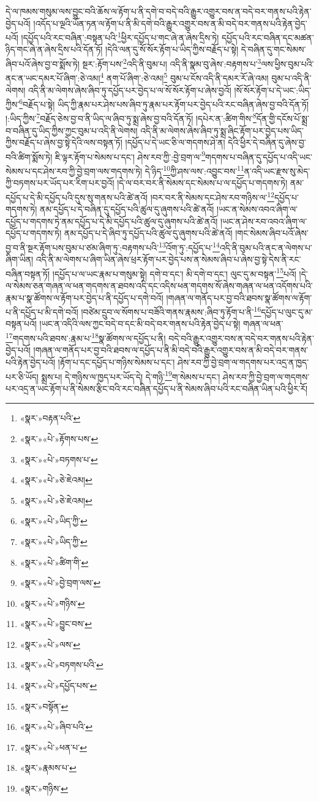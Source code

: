 དེ་ལ་ཁམས་གསུམ་ལས་བྱུང་བའི་ཆོས་ལ་རྟོག་པ་ནི་དགེ་བ་བདེ་བའི་རྒྱུར་འགྱུར་བས་ན་བདེ་བར་གནས་པའི་རྟེན་བྱེད་པའོ། །འདོད་པ་ལྔའི་ཡོན་ཏན་ལ་རྟོག་པ་ནི་མི་དགེ་བའི་རྒྱུར་འགྱུར་བས་ན་མི་བདེ་བར་གནས་པའི་རྟེན་བྱེད་པའོ། །དཔྱོད་པའི་རང་བཞིན་:བསྟན་པའི་\footnote{«སྣར་»བརྟན་པའི་}ཕྱིར་དཔྱོད་པ་གང་ཞེ་ན་ཞེས་དྲིས་ཏེ། དཔྱོད་པའི་རང་བཞིན་དང་མཚན་ཉིད་གང་ཞེ་ན་ཞེས་དྲིས་པའི་དོན་ཏོ། །དེའི་ལན་དུ་སོ་སོར་རྟོག་པ་ཡིད་ཀྱིས་བརྗོད་པ་སྟེ། དེ་བཞིན་དུ་གང་སེམས་ཞིབ་པའོ་ཞེས་བྱ་བ་སྨོས་ཏེ། སྔར་:རྟོག་པས་\footnote{«སྣར་»«པེ་»རྟོགས་པས་}འདི་ནི་བུམ་པ། འདི་ནི་སྣམ་བུ་ཞེས་:བརྟགས་པ་\footnote{«སྣར་»«པེ་»བཏགས་པ་}ལས་ཕྱིས་བུམ་པའི་ནང་ན་ཡང་དམར་པོ་ཞིག་:ཅེ་འམ།\footnote{«སྣར་»«པེ་»ཅེ་ཇེའམ།} ནག་པོ་ཞིག་:ཅེ་འམ།\footnote{«སྣར་»«པེ་»ཅེ་ཇེའམ།} བུམ་པ་ངོས་འདི་ནི་དམར་རོ་ཞེ་འམ། བུམ་པ་འདི་ནི་ལེགས། འདི་ནི་མ་ལེགས་ཞེས་ཞིབ་ཏུ་དཔྱོད་པར་བྱེད་པ་ལ་སོ་སོར་རྟོག་པ་ཞེས་བྱའོ། །སོ་སོར་རྟོག་པ་དེ་ཡང་:ཡིད་ཀྱིས་\footnote{«སྣར་»«པེ་»ཡིད་ཀྱི་}བརྗོད་པ་སྟེ། ཡིད་ཀྱི་རྣམ་པར་ཤེས་པས་ཞིབ་ཏུ་རྣམ་པར་རྟོག་པར་བྱེད་པའི་རང་བཞིན་ཞེས་བྱ་བའི་དོན་ཏོ། །:ཡིད་ཀྱིས་\footnote{«སྣར་»«པེ་»ཡིད་ཀྱི་}བརྗོད་ཅེས་བྱ་བ་ནི་ཡིད་ལ་ཞིབ་ཏུ་སྨྲ་ཞེས་བྱ་བའི་དོན་ཏོ། །དཔེར་ན་:ཚིག་གིས་\footnote{«སྣར་»«པེ་»ཚིག་གི་}དོན་གྱི་དངོས་པོ་སྨྲ་བ་བཞིན་དུ་ཡིད་ཀྱིས་ཀྱང་བུམ་པ་འདི་ནི་ལེགས། འདི་ནི་མ་ལེགས་ཞེས་ཞིབ་ཏུ་སྨྲ་ཞིང་རྟོག་པར་བྱེད་པས་ཡིད་ཀྱིས་བརྗོད་པ་ཞེས་བྱ་སྟེ་དེའི་ལས་བསྟན་ཏོ། །དཔྱོད་པ་དེ་ཡང་ཅི་ལ་གདགས་ཤེ་ན། དེའི་ཕྱིར་དེ་བཞིན་དུ་ཞེས་བྱ་བའི་ཚིག་སྨོས་ཏེ། ཇི་ལྟར་རྟོག་པ་སེམས་པ་དང་། ཤེས་རབ་ཀྱི་:བྱེ་བྲག་ལ་\footnote{«སྣར་»«པེ་»བྱེ་བྲག་ལས་}གདགས་པ་བཞིན་དུ་དཔྱོད་པ་འདི་ཡང་སེམས་པ་དང་ཤེས་རབ་ཀྱི་བྱེ་བྲག་ལས་གདགས་ཏེ། དེ་ཉིད་\footnote{«སྣར་»«པེ་»གཉིས་}ཀྱི་ཤས་ལས་:འབྱུང་བས་\footnote{«སྣར་»«པེ་»བྱུང་བས་}ན་འདི་ཡང་རྫས་སུ་མེད་ཀྱི་བཏགས་པར་ཡོད་པར་རིག་པར་བྱའོ། །དེ་ལ་བར་བར་ནི་སེམས་དང་སེམས་པ་ལ་དཔྱོད་པ་གདགས་ཏེ། ནམ་དཔྱོད་པ་དེ་མི་དཔྱོད་པའི་དུས་སུ་གནས་པའི་ཚེ་ནའོ། །བར་བར་ནི་སེམས་དང་ཤེས་རབ་གཉིས་ལ་\footnote{«སྣར་»«པེ་»ལས་}དཔྱོད་པ་གདགས་ཏེ། ནམ་དཔྱོད་པ་དེ་བཞིན་དུ་དཔྱོད་པའི་ཚུལ་དུ་ཞུགས་པའི་ཚེ་ནའོ། །ཡང་ན་སེམས་འབའ་ཞིག་ལ་དཔྱོད་པ་གདགས་ཏེ་ནམ་དཔྱོད་པ་དེ་མི་དཔྱོད་པའི་ཚུལ་དུ་ཞུགས་པའི་ཚེ་ནའོ། །ཡང་ན་ཤེས་རབ་འབའ་ཞིག་ལ་དཔྱོད་པ་གདགས་ཏེ། ནམ་དཔྱོད་པ་དེ་ཞིབ་ཏུ་དཔྱོད་པའི་ཚུལ་དུ་ཞུགས་པའི་ཚེ་ནའོ། །གང་སེམས་ཞིབ་པའོ་ཞེས་བྱ་བ་ནི་སྔར་རྟོག་པས་བུམ་པ་ཙམ་ཞིག་ཏུ་:བརྟགས་པའི་\footnote{«སྣར་»«པེ་»བཏགས་པའི་}འོག་ཏུ་:དཔྱོད་པ་\footnote{«སྣར་»«པེ་»དཔྱོད་པས་}འདི་ནི་བུམ་པའི་ནང་ན་ལེགས་པ་ཞིག་ཡིན། འདི་ནི་མ་ལེགས་པ་ཞིག་ཡིན་ཞེས་ཕྲར་རྟོག་པར་བྱེད་པས་ན་སེམས་ཞིབ་པ་ཞེས་བྱ་སྟེ་དེས་ནི་རང་བཞིན་བསྟན་ཏོ། །དཔྱོད་པ་ལ་ཡང་རྣམ་པ་གསུམ་སྟེ། དགེ་བ་དང་། མི་དགེ་བ་དང་། ལུང་དུ་མ་བསྟན་\footnote{«སྣར་»བསྟོན་}པའོ། །དེ་ལ་སེམས་ཅན་གཞན་ལ་ཕན་གདགས་ན་ཐབས་འདི་དང་འདིས་ཕན་གདགས་སོ་ཞེས་གཞན་ལ་ཕན་འདོགས་པའི་རྣམ་པ་སྣ་ཚོགས་ལ་རྟོག་པར་བྱེད་པ་ནི་དཔྱོད་པ་དགེ་བའོ། །གཞན་ལ་གནོད་པར་བྱ་བའི་ཐབས་སྣ་ཚོགས་ལ་རྟོག་པ་ནི་དཔྱོད་པ་མི་དགེ་བའོ། །བཙེམ་དྲུབ་ལ་སོགས་པ་བཟོའི་གནས་རྣམས་:ཞིབ་ཏུ་རྟོག་པ་ནི་\footnote{«སྣར་»«པེ་»ཞིབ་པའི་}དཔྱོད་པ་ལུང་དུ་མ་བསྟན་པའོ། །ཡང་ན་འདིའི་ལས་ཀྱང་བདེ་བ་དང་མི་བདེ་བར་གནས་པའི་རྟེན་བྱེད་པ་སྟེ། གཞན་ལ་ཕན་\footnote{«སྣར་»«པེ་»ཕན་པ་}གདགས་པའི་ཐབས་:རྣམ་པ་\footnote{«སྣར་»རྣམས་པ་}སྣ་ཚོགས་ལ་དཔྱོད་པ་ནི། བདེ་བའི་རྒྱུར་འགྱུར་བས་ན་བདེ་བར་གནས་པའི་རྟེན་བྱེད་པའོ། །གཞན་ལ་གནོད་པར་བྱ་བའི་ཐབས་ལ་དཔྱོད་པ་ནི་མི་བདེ་བའི་རྒྱུར་འགྱུར་བས་ན་མི་བདེ་བར་གནས་པའི་རྟེན་བྱེད་པའོ། །རྟོག་པ་དང་དཔྱོད་པ་གཉིས་སེམས་པ་དང་། ཤེས་རབ་ཀྱི་བྱེ་བྲག་ལ་གདགས་པར་འདྲ་ན་ཁྱད་པར་ཅི་ཡོད། སྨྲས་པ། དེ་གཉིས་ལ་ཁྱད་པར་ཡོད་དེ། དེ་གཉི་\footnote{«སྣར་»གཉིས་}ག་སེམས་པ་དང་། ཤེས་རབ་ཀྱི་བྱེ་བྲག་ལ་གདགས་པར་འདྲ་ན་ཡང་རྟོག་པ་ནི་སེམས་རྩིང་བའི་རང་བཞིན་དཔྱོད་པ་ནི་སེམས་ཞིབ་པའི་རང་བཞིན་ཡིན་པའི་ཕྱིར་རོ། 